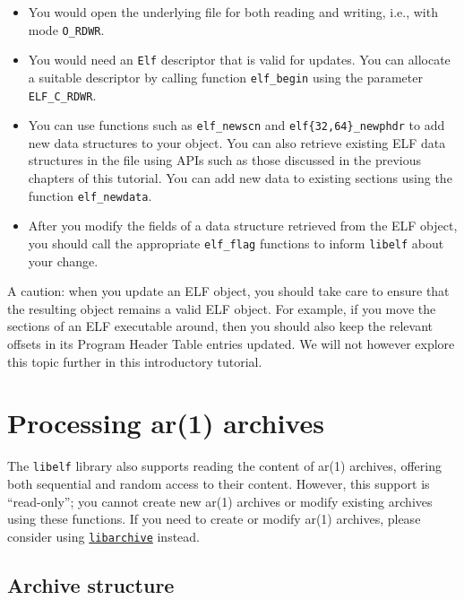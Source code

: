 \documentclass[a4paper,pdftex]{book}
\newcommand{\constant}[1]{\texttt{#1}}
\newcommand{\function}[1]{\texttt{#1}}
\newcommand{\library}[1]{\texttt{#1}}
\newcommand{\type}[1]{\texttt{#1}}
\newcommand{\elfdatastructure}[1]{\textsf{#1}}
\begin{document}
\begin{itemize}
\item You would open the underlying file for both reading and writing,
  i.e., with mode \constant{O\_RDWR}.

\item You would need an \type{Elf} descriptor that is valid for
  updates.  You can allocate a suitable descriptor by calling function
  \function{elf\_begin} using the parameter \constant{ELF\_C\_RDWR}.

\item You can use functions such as \function{elf\_newscn} and
  \function{elf\{32,64\}\_newphdr} to add new data structures to your
  object. You can also retrieve existing ELF data structures in the
  file using APIs such as those discussed in the previous chapters of
  this tutorial.  You can add new data to existing sections using the
  function \function{elf\_newdata}.

\item After you modify the fields of a data structure retrieved from
  the ELF object, you should call the appropriate
  \function{elf\_flag} functions to inform \library{libelf} about
  your change.
\end{itemize}

A caution: when you update an ELF object, you should take care to
ensure that the resulting object remains a valid ELF object. For
example, if you move the sections of an ELF executable around, then
you should also keep the relevant offsets in its
\elfdatastructure{Program Header Table} entries updated. We will not
however explore this topic further in this introductory tutorial.

\chapter{Processing ar(1) archives}\label{chap.ar}

The \library{libelf} library also supports reading the content of
ar(1) archives, offering both sequential and random access to their
content.  However, this support is ``read-only''; you cannot create
new ar(1) archives or modify existing archives using these
functions. If you need to create or modify ar(1) archives, please
consider using
\href{https://github.com/libarchive/libarchive/wiki}{\library{libarchive}}
instead.

\section{Archive structure}
\end{document}
